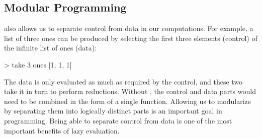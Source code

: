 \subsection{Modular Programming}\label{subsec:Modular_Programming}
 also allows us to separate control from data in our computations.
For example, a list of three ones can be produced by selecting the first three elements (control) of the infinite list of ones (data):
\begin{haskellsource}
> take 3 ones
[1, 1, 1]
\end{haskellsource}

The data is only evaluated as much as required by the control, and these two take it in turn to perform reductions.
Without , the control and data parts would need to be combined in the form of a single function.
Allowing us to modularize by separating them into logically distinct parts is an important goal in programming.
Being able to separate control from data is one of the most important benefits of lazy evaluation.


